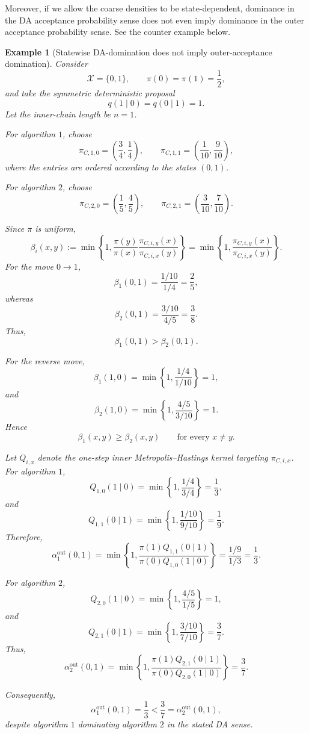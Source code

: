 \documentclass[12pt]{article}
\theoremstyle{definition}
\theoremstyle{remark}
\theoremstyle{plain}
\newtheorem{example}[theorem]{Example}
\begin{document}
Moreover, if we allow the coarse densities to be state-dependent, 
dominance in the DA acceptance probability sense does not even imply dominance in the outer acceptance probability sense.
See the counter example below. 

\begin{example}[Statewise DA-domination does not imply outer-acceptance domination]
Consider
\[
\mathcal X=\{0,1\},
\qquad
\pi(0)=\pi(1)=\frac12,
\]
and take the symmetric deterministic proposal
\[
q(1\mid0)=q(0\mid1)=1.
\]
Let the inner-chain length be $n=1$.

For algorithm $1$, choose
\[
\pi_{C,1,0}
=
\left(\frac34,\frac14\right),
\qquad
\pi_{C,1,1}
=
\left(\frac1{10},\frac9{10}\right),
\]
where the entries are ordered according to the states $(0,1)$.

For algorithm $2$, choose
\[
\pi_{C,2,0}
=
\left(\frac15,\frac45\right),
\qquad
\pi_{C,2,1}
=
\left(\frac3{10},\frac7{10}\right).
\]

Since $\pi$ is uniform,
\[
\beta_i(x,y)
:=
\min\left\{
1,
\frac{\pi(y)}{\pi(x)}
\frac{\pi_{C,i,y}(x)}
      {\pi_{C,i,x}(y)}
\right\}
=
\min\left\{
1,
\frac{\pi_{C,i,y}(x)}
      {\pi_{C,i,x}(y)}
\right\}.
\]
For the move $0\to1$,
\[
\beta_1(0,1)
=
\frac{1/10}{1/4}
=
\frac25,
\]
whereas
\[
\beta_2(0,1)
=
\frac{3/10}{4/5}
=
\frac38.
\]
Thus,
\[
\beta_1(0,1)>\beta_2(0,1).
\]

For the reverse move,
\[
\beta_1(1,0)
=
\min\left\{1,\frac{1/4}{1/10}\right\}
=
1,
\]
and
\[
\beta_2(1,0)
=
\min\left\{1,\frac{4/5}{3/10}\right\}
=
1.
\]
Hence
\[
\beta_1(x,y)\geq\beta_2(x,y)
\qquad
\text{for every }x\neq y.
\]

Let $Q_{i,x}$ denote the one-step inner Metropolis--Hastings kernel
targeting $\pi_{C,i,x}$. For algorithm $1$,
\[
Q_{1,0}(1\mid0)
=
\min\left\{1,\frac{1/4}{3/4}\right\}
=
\frac13,
\]
and
\[
Q_{1,1}(0\mid1)
=
\min\left\{1,\frac{1/10}{9/10}\right\}
=
\frac19.
\]
Therefore,
\[
\alpha_1^{\mathrm{out}}(0,1)
=
\min\left\{
1,
\frac{\pi(1)Q_{1,1}(0\mid1)}
      {\pi(0)Q_{1,0}(1\mid0)}
\right\}
=
\frac{1/9}{1/3}
=
\frac13.
\]

For algorithm $2$,
\[
Q_{2,0}(1\mid0)
=
\min\left\{1,\frac{4/5}{1/5}\right\}
=
1,
\]
and
\[
Q_{2,1}(0\mid1)
=
\min\left\{1,\frac{3/10}{7/10}\right\}
=
\frac37.
\]
Thus,
\[
\alpha_2^{\mathrm{out}}(0,1)
=
\min\left\{
1,
\frac{\pi(1)Q_{2,1}(0\mid1)}
      {\pi(0)Q_{2,0}(1\mid0)}
\right\}
=
\frac37.
\]

Consequently,
\[
\alpha_1^{\mathrm{out}}(0,1)
=
\frac13
<
\frac37
=
\alpha_2^{\mathrm{out}}(0,1),
\]
despite algorithm $1$ dominating algorithm $2$ in the stated
DA sense.
\end{example}
\end{document}
